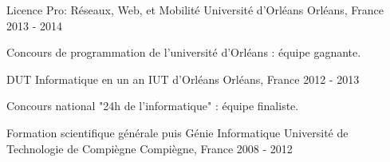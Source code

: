 \begin{cventries}
  \cventry
    {Licence Pro: Réseaux, Web, et Mobilité}
    {Université d'Orléans}
    {Orléans, France}
    {2013 - 2014}
    {
      \begin{cvitems}
        \item {Concours de programmation de l'université d'Orléans : équipe gagnante.}
      \end{cvitems}
    }
  \cventry
    {DUT Informatique en un an}
    {IUT d'Orléans}
    {Orléans, France}
    {2012 - 2013}
    {
      \begin{cvitems}
        \item {Concours national "24h de l'informatique" : équipe finaliste.}
      \end{cvitems}
    }
  \cventry
    {Formation scientifique générale puis Génie Informatique}
    {Université de Technologie de Compiègne}
    {Compiègne, France}
    {2008 - 2012}
    {}
\end{cventries}

